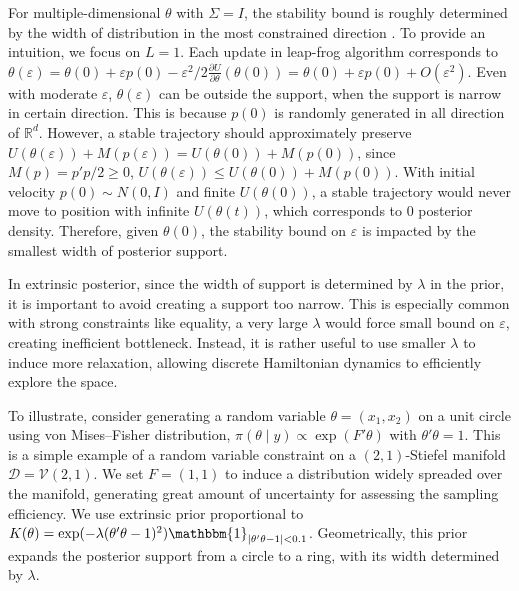 \documentclass[10pt]{article}
\newcommand{\mc}[1]{\mathcal{#1}}
\begin{document}
For multiple-dimensional $\theta$ with $\Sigma=I$, the stability bound is roughly determined by the width of distribution in the most constrained direction  \citep{neal2011mcmc}. To provide an intuition, we focus on $L=1$. Each update in leap-frog algorithm corresponds to $\theta(\varepsilon)=\theta(0) + \varepsilon  p(0) - \varepsilon^2/2  \frac{\partial U}{\partial  \theta } ( \theta (0)) = \theta(0) + \varepsilon  p(0) + O(\varepsilon^2)$. Even with moderate $\varepsilon$, $\theta(\varepsilon)$ can be outside the support, when the support is narrow in certain direction. This is because $p(0)$ is randomly generated in all direction of $\mathbb R^d$. However, a stable trajectory should approximately preserve $U(\theta(\varepsilon))+M(p(\varepsilon)) = U(\theta(0))+M(p(0))$, since $M(p)= p'p/2 \ge 0$, $U(\theta(\varepsilon))\le  U(\theta(0))+M(p(0))$. With initial velocity $p(0)\sim N(0, I)$ and finite $U(\theta(0))$, a stable trajectory would never move to position with infinite $U(\theta(t))$, which corresponds to $0$ posterior density. Therefore, given $\theta(0)$, the stability bound on $\varepsilon$ is impacted by the smallest width of posterior support.

In extrinsic posterior, since the width of support is determined by $\lambda$ in the prior, it is important to avoid creating a support too narrow. This is especially common with strong constraints like equality, a very large $\lambda$ would force small bound on $\varepsilon$, creating inefficient bottleneck. Instead, it is rather useful to use smaller $\lambda$ to induce more relaxation, allowing discrete Hamiltonian dynamics to efficiently explore the space.

To illustrate, consider generating a random variable $\theta=(x_1,x_2)$ on a unit circle using von Mises--Fisher distribution, $\pi(\theta \mid y) \propto \exp(F'\theta)$ with $\theta'\theta =1$. This is a simple example of a random variable constraint on a $(2,1)$-Stiefel manifold $\mc D =\mc V(2,1)$. We set $F=(1,1)$ to induce a distribution widely spreaded over the manifold, generating great amount of uncertainty for assessing the sampling efficiency. We use extrinsic prior proportional to $K(\theta)= \exp(-\lambda (\theta'\theta -1)^2) \mathbbm{1}_{|\theta'\theta -1|<0.1}$. Geometrically, this prior expands the posterior support from a circle to a ring, with its width determined by $\lambda$.
\end{document}
